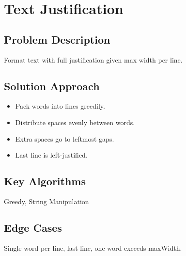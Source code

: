 \documentclass[10pt, a4paper]{article}
\begin{document}
\section{Text Justification}
\subsection*{Problem Description}
Format text with full justification given max width per line.

\subsection*{Solution Approach}
\begin{itemize}
    \item Pack words into lines greedily.
    \item Distribute spaces evenly between words.
    \item Extra spaces go to leftmost gaps.
    \item Last line is left-justified.
\end{itemize}

\subsection*{Key Algorithms}
Greedy, String Manipulation

\subsection*{Edge Cases}
Single word per line, last line, one word exceeds maxWidth.
\end{document}
